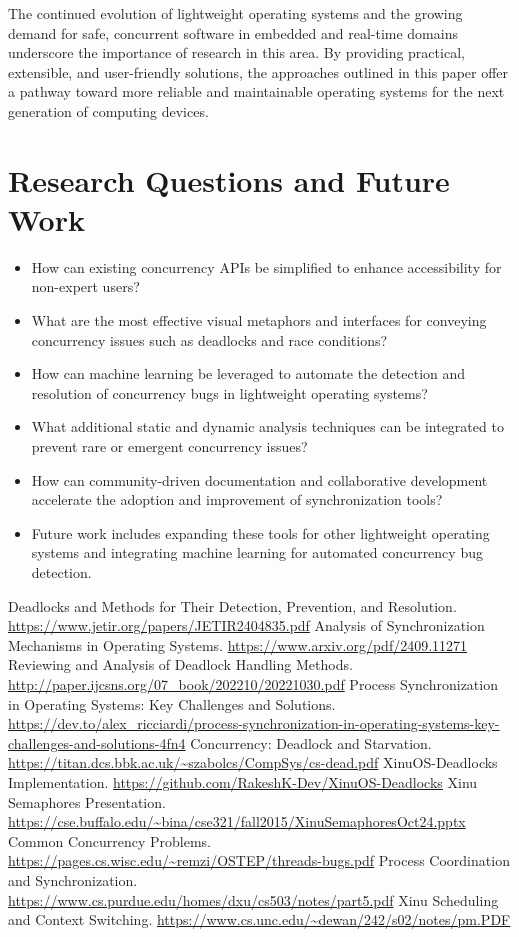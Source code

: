 \documentclass[conference,a4paper]{IEEEtran}
\begin{document}
The continued evolution of lightweight operating systems and the growing demand for safe, concurrent software in embedded and real-time domains underscore the importance of research in this area. By providing practical, extensible, and user-friendly solutions, the approaches outlined in this paper offer a pathway toward more reliable and maintainable operating systems for the next generation of computing devices.

\section*{Research Questions and Future Work}

\begin{itemize}
    \item How can existing concurrency APIs be simplified to enhance accessibility for non-expert users?
    \item What are the most effective visual metaphors and interfaces for conveying concurrency issues such as deadlocks and race conditions?
    \item How can machine learning be leveraged to automate the detection and resolution of concurrency bugs in lightweight operating systems?
    \item What additional static and dynamic analysis techniques can be integrated to prevent rare or emergent concurrency issues?
    \item How can community-driven documentation and collaborative development accelerate the adoption and improvement of synchronization tools?
    \item Future work includes expanding these tools for other lightweight operating systems and integrating machine learning for automated concurrency bug detection.
\end{itemize}

\begin{thebibliography}{10}
Deadlocks and Methods for Their Detection, Prevention, and Resolution. \url{https://www.jetir.org/papers/JETIR2404835.pdf}
Analysis of Synchronization Mechanisms in Operating Systems. \url{https://www.arxiv.org/pdf/2409.11271}
Reviewing and Analysis of Deadlock Handling Methods. \url{http://paper.ijcsns.org/07_book/202210/20221030.pdf}
Process Synchronization in Operating Systems: Key Challenges and Solutions. \url{https://dev.to/alex_ricciardi/process-synchronization-in-operating-systems-key-challenges-and-solutions-4fn4}
Concurrency: Deadlock and Starvation. \url{https://titan.dcs.bbk.ac.uk/~szabolcs/CompSys/cs-dead.pdf}
XinuOS-Deadlocks Implementation. \url{https://github.com/RakeshK-Dev/XinuOS-Deadlocks}
Xinu Semaphores Presentation. \url{https://cse.buffalo.edu/~bina/cse321/fall2015/XinuSemaphoresOct24.pptx}
Common Concurrency Problems. \url{https://pages.cs.wisc.edu/~remzi/OSTEP/threads-bugs.pdf}
Process Coordination and Synchronization. \url{https://www.cs.purdue.edu/homes/dxu/cs503/notes/part5.pdf}
Xinu Scheduling and Context Switching. \url{https://www.cs.unc.edu/~dewan/242/s02/notes/pm.PDF}
\end{thebibliography}
\end{document}
